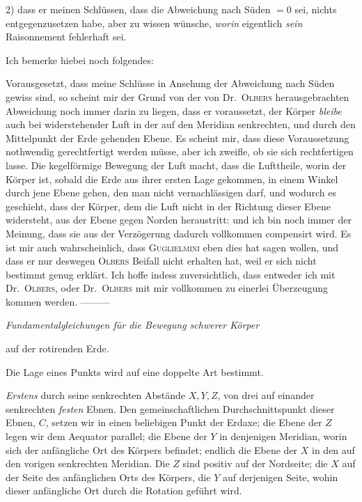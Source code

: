 2) dass er meinen Schlüssen, dass die Abweichung nach Süden $=0$ sei, nichts entgegenzusetzen habe, aber zu wissen wünsche, \textit{worin} eigentlich \textit{sein} Raisonnement fehlerhaft sei.

Ich bemerke hiebei noch folgendes:

Vorausgesetzt, dass meine Schlüsse in Ansehung der Abweichung nach Süden gewiss sind, so scheint mir der Grund von der von Dr.\ \textsc{Olbers} herausgebrachten Abweichung noch immer darin zu liegen, dass er voraussetzt, der Körper \textit{bleibe} auch bei widerstehender Luft in der auf den Meridian senkrechten, und durch den Mittelpunkt der Erde gehenden Ebene. Es scheint mir, dass diese Voraussetzung nothwendig gerechtfertigt werden müsse, aber ich zweifle, ob sie sich rechtfertigen lasse. Die kegelförmige Bewegung der Luft macht, dass die Lufttheile, worin der Körper ist, sobald die Erde aus ihrer ersten Lage gekommen, in einem Winkel durch jene Ebene gehen, den man nicht vernachlässigen darf, und wodurch es geschieht, dass der Körper, dem die Luft nicht in der Richtung dieser Ebene widersteht, aus der Ebene gegen Norden heraustritt: und ich bin noch immer der Meinung, dass sie aus der Verzögerung dadurch vollkommen compensirt wird. Es ist mir auch wahrscheinlich, dass \textsc{Guglielmini} eben dies hat sagen wollen, und dass er nur deswegen \textsc{Olbers} Beifall nicht erhalten hat, weil er sich nicht bestimmt genug erklärt. Ich hoffe indess zuversichtlich, dass entweder ich mit Dr.\ \textsc{Olbers}, oder Dr.\ \textsc{Olbers} mit mir vollkommen zu einerlei Überzeugung kommen werden. —\quad—\quad—

\par{}
\par\clearpage
{}
\vspace*{.032\textheight}
\begin{center}{\large\itshape Fundamentalgleichungen für die Bewegung schwerer Körper\par auf der rotirenden Erde.}\end{center}
Die Lage eines Punkts wird auf eine doppelte Art bestimmt.

\textit{Erstens} durch seine senkrechten Abstände $X,Y,Z$, von drei auf einander senkrechten \textit{festen} Ebnen. Den gemeinschaftlichen Durchschnittspunkt dieser Ebnen, $C$, setzen wir in einen beliebigen Punkt der Erdaxe; die Ebene der $Z$ legen wir dem Aequator parallel; die Ebene der $Y$ in denjenigen Meridian, worin sich der anfängliche Ort des Körpers befindet; endlich die Ebene der $X$ in den auf den vorigen senkrechten Meridian. Die $Z$ sind positiv auf der Nordseite; die $X$ auf der Seite des anfänglichen Orts des Körpers, die $Y$ auf derjenigen Seite, wohin dieser anfängliche Ort durch die Rotation geführt wird.

